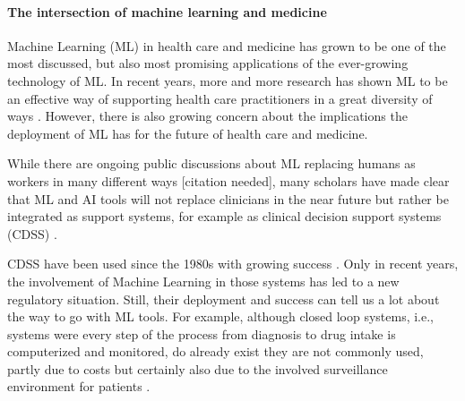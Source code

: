 \paragraph{The intersection of machine learning and medicine}

Machine Learning (ML) in health care and medicine has grown to be one of the most discussed, but also most promising applications of the ever-growing technology of ML. In recent years, more and more research has shown ML to be an effective way of supporting health care practitioners in a great diversity of ways \cite{rajpurkar2022ai, topol2019high}. However, there is also growing concern about the implications the deployment of ML has for the future of health care and medicine. 

While there are ongoing public discussions about ML replacing humans as workers in many different ways [citation needed], many scholars have made clear that ML and AI tools will not replace clinicians in the near future but rather be integrated as support systems, for example as clinical decision support systems (CDSS) \cite{Morley2020}.

CDSS have been used since the 1980s with growing success \cite{sutton2020overview}. Only in recent years, the involvement of Machine Learning in those systems has led to a new regulatory situation. Still, their deployment and success can tell us a lot about the way to go with ML tools. For example, although closed loop systems, i.e., systems were every step of the process from diagnosis to drug intake is computerized and monitored, do already exist they are not commonly used, partly due to costs but certainly also due to the involved surveillance environment for patients \cite{sutton2020overview}. 




